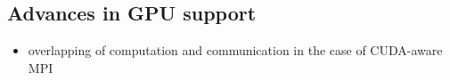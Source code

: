 \documentclass{ansarticle-preprint}
\begin{document}



\subsection{Advances in GPU support}
\label{subsec:gpu}

\begin{itemize}
\item overlapping of computation and communication in the case of CUDA-aware MPI
\end{itemize}
\end{document}
